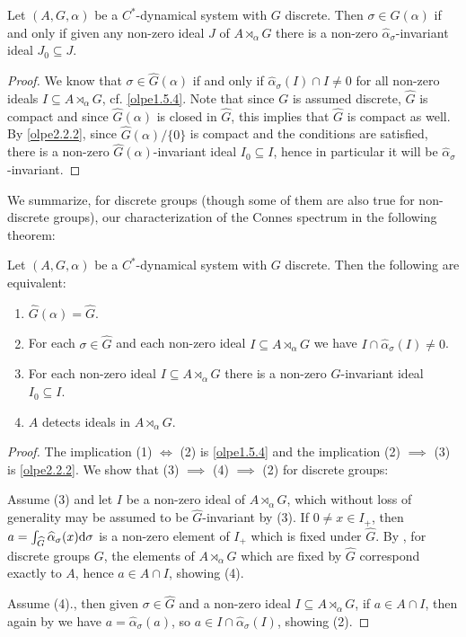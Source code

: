 \begin{proposition}
	Let $(A,G,\alpha)$ be a $C^*$-dynamical system with $G$ discrete. Then $\sigma \in \hat G(\alpha)$ if and only if given any non-zero ideal $J$ of $A \rtimes_\alpha G$ there is a non-zero $\hat \alpha_\sigma$-invariant ideal $J_0 \subseteq J$.
	\label{olpe2.2.4}
\end{proposition}
\begin{proof}
	We know that $\sigma \in \hat G(\alpha)$ if and only if $\hat \alpha_\sigma(I) \cap I \neq 0$ for all non-zero ideals $I\subseteq A \rtimes_\alpha G$, cf. \cref{olpe1.5.4}. Note that since $G$ is assumed discrete, $\hat G$ is compact and since $\hat G(\alpha)$ is closed in $\hat G$, this implies that $\hat G$ is compact as well. By \cref{olpe2.2.2}, since $\hat G(\alpha) /\{0\}$ is compact and the conditions are satisfied, there is a non-zero $\hat G(\alpha)$-invariant ideal $I_0\subseteq I$, hence in particular it will be $\hat \alpha_\sigma$-invariant. 
\end{proof}
We summarize, for discrete groups (though some of them are also true for non-discrete groups), our characterization of the Connes spectrum in the following theorem:
\begin{theorem}
	Let $(A,G,\alpha)$ be a $C^*$-dynamical system with $G$ discrete. Then the following are equivalent:
	\begin{enumerate}
		\item $\hat G(\alpha) = \hat G$.
		\item For each $\sigma \in \hat G$ and each non-zero ideal $I \subseteq A \rtimes_\alpha G$ we have $I \cap \hat \alpha_\sigma(I) \neq 0$.
		\item For each non-zero ideal $I \subseteq A \rtimes_\alpha G$ there is a non-zero $\hat G$-invariant ideal $I_0 \subseteq I$.
		\item $A$ detects ideals in $A \rtimes_\alpha G$.
	\end{enumerate}
	\label{olpe2.2.5}
\end{theorem}
\begin{proof}
	The implication (1) $\iff$ (2) is \cref{olpe1.5.4} and the implication (2) $\implies$ (3) is \cref{olpe2.2.2}. We show that (3) $\implies$ (4) $\implies$ (2) for discrete groups:

	Assume (3) and let $I$ be a non-zero ideal of $A \rtimes_\alpha G$, which without loss of generality may be assumed to be $\hat G$-invariant by (3). If $0 \neq x \in I_+$, then $a = \int_{\widehat{G}} \widehat{\alpha}_{\sigma}(x) \mathrm{d} \sigma$ is a non-zero element of $I_+$ which is fixed under $\hat G$. By \cite[lemma 3.2]{landstad1979towards}, for discrete groups $G$, the elements of $A \rtimes_\alpha G$ which are fixed by $\hat G$ correspond exactly to $A$, hence $a \in A \cap I$, showing (4).

	Assume (4)., then given $\sigma \in \hat G$ and a non-zero ideal $I \subseteq A \rtimes_\alpha G$, if $a \in A \cap I$, then again by \cite[lemma 3.2]{landstad1979towards} we have $a = \hat \alpha_\sigma(a)$, so $a \in I \cap \hat \alpha_\sigma(I)$, showing (2).
\end{proof}

